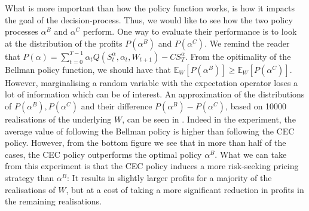 \documentclass{rsproca_new}
\theoremstyle{definition}
\begin{document}
What is more important than how the policy function works, is how it
impacts the goal of the decision-process. Thus, we would like to see
how the two policy processes $\alpha^B$ and $\alpha^C$ perform.
One way to evaluate their performance is to look at
the distribution of the profits $P(\alpha^B)$ and $P(\alpha^C)$.
We remind the reader that
$P(\alpha) =
\sum_{t=0}^{T-1}\alpha_tQ(S_t^\alpha,\alpha_t,W_{t+1})-CS_T^\alpha$.
From the opitimality of the Bellman policy function, we should have
that $\mathbb E_W[P(\alpha^B)]\geq \mathbb E_W[P(\alpha^C)]$.
However, marginalising a random variable with the expectation operator
loses a lot of information which can be of interest.
An approximation of the distributions of $P(\alpha^B), P(\alpha^C)$
and their difference
$P(\alpha^B)-P(\alpha^C)$, based on \num{10000} realisations of the
underlying $W$, can be seen in .
Indeed in the experiment, the average value of following the
Bellman policy is higher than following the CEC policy.
However, from the bottom figure we see that
in more than half of the cases, the CEC policy outperforms the optimal
policy $\alpha^B$. What we can take from this experiment is that
the CEC policy induces a more risk-seeking pricing strategy than
$\alpha^B$: It results in slightly larger profits for a majority of the
realisations of $W$, but at a cost of taking a more significant
reduction in
profits in the remaining realisations.
\end{document}
